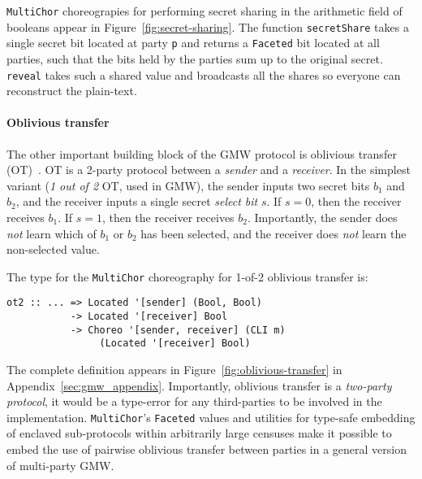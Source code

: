 \documentclass[sigplan,screen]{acmart}
\newcommand{\inlinecode}[2][haskell]{\texttt{#2}}
\newcommand{\MultiChor}{\texttt{Multi\-Chor}\xspace}
\begin{document}
\MultiChor choreograpies for performing secret sharing in the arithmetic field of booleans appear in Figure~\ref{fig:secret-sharing}. The function \inlinecode{secretShare} takes a single secret bit located at party \inlinecode{p} and returns a \inlinecode{Faceted} bit located at all parties, such that the bits held by the parties sum up to the original secret.
\inlinecode{reveal} takes such a shared value and broadcasts
all the shares so everyone can reconstruct the plain-text.

\paragraph{Oblivious transfer}
The other important building block of the GMW protocol is oblivious transfer (OT)~\cite{naor2001efficient}. OT is a 2-party protocol between a \emph{sender} and a \emph{receiver}. In the simplest variant (\emph{1 out of 2} OT, used in GMW), the sender inputs two secret bits $b_1$ and $b_2$, and the receiver inputs a single secret \emph{select bit} $s$. If $s=0$, then the receiver receives $b_1$. If $s=1$, then the receiver receives $b_2$. Importantly, the sender does \emph{not} learn which of $b_1$ or $b_2$ has been selected, and the receiver does \emph{not} learn the non-selected value.

The type for the  \MultiChor choreography for 1-of-2 oblivious transfer is:
%
\begin{verbatim}
ot2 :: ... => Located '[sender] (Bool, Bool)
           -> Located '[receiver] Bool
           -> Choreo '[sender, receiver] (CLI m) 
                (Located '[receiver] Bool)
\end{verbatim}
%
The complete definition appears in Figure~\ref{fig:oblivious-transfer} in Appendix~\ref{sec:gmw_appendix}. Importantly, oblivious transfer is a \emph{two-party protocol}, it would be a type-error for any third-parties to be involved in the implementation. \MultiChor's \inlinecode{Faceted} values and utilities for type-safe embedding of enclaved sub-protocols within arbitrarily large censuses make it possible to embed the use of pairwise oblivious transfer between parties in a general version of multi-party GMW.
\end{document}
